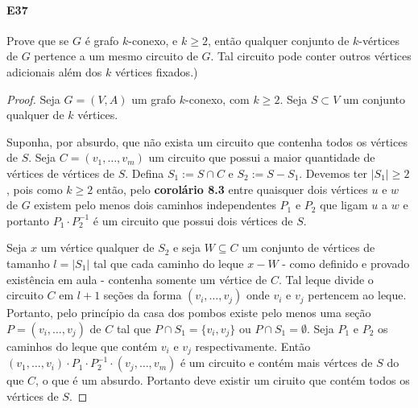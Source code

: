 \documentclass[11pt,a4paper,notitlepage]{exam}
\begin{document}
    \paragraph*{E37} Prove que se $G$ é grafo $k$-conexo, e
    $k\geq2$, então qualquer conjunto de $k$-vértices de $G$
    pertence a um mesmo circuito de $G$. Tal circuito pode conter outros
    vértices adicionais além dos $k$ vértices fixados.)
    \begin{proof}
        Seja $G = (V,A)$ um grafo $k$-conexo, com $k\geq2$. Seja
        $S \subset V$ um conjunto qualquer de $k$ vértices. \par
        Suponha, por absurdo, que não exista um circuito que
        contenha todos os vértices de $S$. Seja $C = (v_1, \dots,
        v_m)$ um circuito que
        possui a maior quantidade de vértices de vértices de $S$.
        Defina $S_1 := S \cap C$ e $S_2 := S - S_1$. Devemos ter $|S_1|
        \geq 2$, pois como $k \geq 2$ então, pelo \textbf{corolário 8.3}
        entre quaisquer dois vértices $u$ e $w$ de $G$ existem pelo
        menos dois caminhos
        independentes $P_1$ e $P_2$ que ligam $u$ a $w$ e portanto
        $P_1\cdot P_2^{-1}$ é um circuito que possui dois vértices de
        $S$.\par
        Seja $x$ um vértice qualquer de $S_2$ e seja $W\subseteq
        C$ um conjunto de vértices de tamanho $l = |S_1|$ tal que cada caminho
        do leque $x-W$ - como definido e provado existência em aula -
        contenha somente um vértice de $C$. Tal leque divide
        o circuito $C$ em $l+1$ seções da forma $(v_i,\dots,v_j)$
        onde $v_i$ e $v_j$ pertencem ao leque. Portanto, pelo princípio
        da casa dos pombos existe pelo menos uma seção $P = (v_i, \dots,v_j)$ de
        $C$ tal que $P\cap S_1 = \{v_i, v_j\}$ ou $P\cap S_1 =
        \emptyset$. Seja $P_1$ e $P_2$ os caminhos do leque que contém
        $v_i$ e $v_j$ respectivamente. Então
        $(v_1,\dots,v_i)\cdot P_1 \cdot P_2^{-1} \cdot (v_j, \dots,
        v_m)$ é um circuito e contém mais vértces de $S$ do que $C$, o
        que é um absurdo. Portanto deve existir um ciruito que contém
        todos os vértices de $S$.
    \end{proof}
\end{document}
